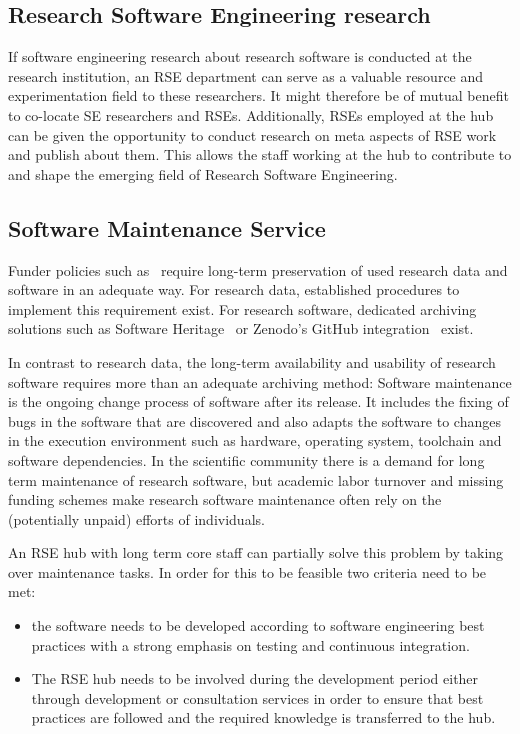 \documentclass[a4paper]{article}
\begin{document}
\subsection{Research Software Engineering research}
\label{sec:rseresearch}

If software engineering research about research software is conducted at the research institution, an RSE department can serve as a valuable resource and experimentation field to these researchers.
It might therefore be of mutual benefit to co-locate SE researchers and RSEs.
Additionally, RSEs employed at the hub can be given the opportunity to conduct research on meta aspects of RSE work and publish about them.
This allows the staff working at the hub to contribute to and shape the emerging field of Research Software Engineering.

\subsection{Software Maintenance Service}
\label{sec:maintenance}

Funder policies such as~\autocite{dfg_gsp} require long-term preservation of used research data and software in an adequate way.
For research data, established procedures to implement this requirement exist.
For research software, dedicated archiving solutions such as Software Heritage~\autocite{DiCosmo2020,DiCosmo2023} or Zenodo's GitHub integration~\autocite{GitHubZenodo} exist.

In contrast to research data, the long-term availability and usability of research software requires more than an adequate archiving method:
Software maintenance is the ongoing change process of software after its release.
It includes the fixing of bugs in the software that are discovered and also adapts the software to changes in the execution environment such as hardware, operating system, toolchain and software dependencies.
In the scientific community there is a demand for long term maintenance of research software,
but academic labor turnover and missing funding schemes make research software maintenance often rely on the (potentially unpaid) efforts of individuals.

An RSE hub with long term core staff can partially solve this problem by taking over maintenance tasks.
In order for this to be feasible two criteria need to be met:
\begin{itemize}
\item the software needs to be developed according to software engineering best practices with a strong emphasis on testing and continuous integration.
\item The RSE hub needs to be involved during the development period either through development or consultation services in order to ensure that best practices are followed and the required knowledge is transferred to the hub.
\end{itemize}
\end{document}
